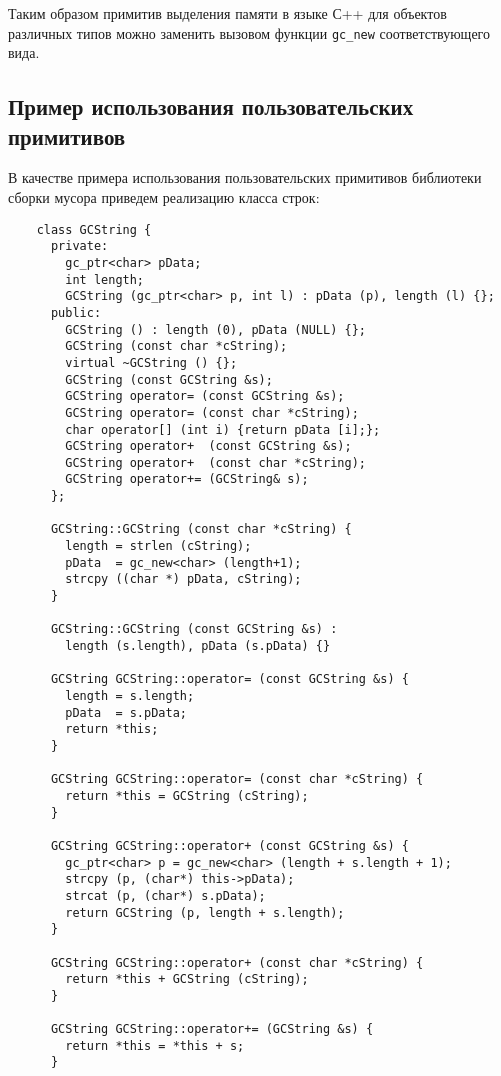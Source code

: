 Таким образом примитив выделения памяти в языке С++ для объектов различных типов можно заменить вызовом функции \lstinline{gc_new} 
соответствующего вида.

\subsection{Пример использования пользовательских\\
примитивов}

В качестве примера использования пользовательских примитивов библиотеки сборки мусора приведем 
реализацию класса строк:

\begin{lstlisting}
    class GCString {
      private:
        gc_ptr<char> pData; 	
        int length;	 
        GCString (gc_ptr<char> p, int l) : pData (p), length (l) {};     
      public:
        GCString () : length (0), pData (NULL) {};
        GCString (const char *cString);
        virtual ~GCString () {};
        GCString (const GCString &s);
        GCString operator= (const GCString &s);
        GCString operator= (const char *cString);
        char operator[] (int i) {return pData [i];};
        GCString operator+  (const GCString &s);
        GCString operator+  (const char *cString);
        GCString operator+= (GCString& s);
      };

      GCString::GCString (const char *cString) {
        length = strlen (cString);
        pData  = gc_new<char> (length+1);
        strcpy ((char *) pData, cString);
      }

      GCString::GCString (const GCString &s) : 
        length (s.length), pData (s.pData) {}

      GCString GCString::operator= (const GCString &s) {
        length = s.length;
        pData  = s.pData;
        return *this;
      }

      GCString GCString::operator= (const char *cString) {
        return *this = GCString (cString);
      }

      GCString GCString::operator+ (const GCString &s) {
        gc_ptr<char> p = gc_new<char> (length + s.length + 1);
        strcpy (p, (char*) this->pData);
        strcat (p, (char*) s.pData);
        return GCString (p, length + s.length);
      }

      GCString GCString::operator+ (const char *cString) {
        return *this + GCString (cString);
      }

      GCString GCString::operator+= (GCString &s) {
        return *this = *this + s;
      }
\end{lstlisting}
